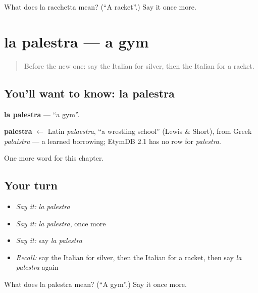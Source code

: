 \begin{tcolorbox}[breakable,colback=teal!4,colframe=teal!35!black,title={Before you move on}]
What does la racchetta mean? (\textquotedblleft{}A racket\textquotedblright{}.) Say it once more.
\end{tcolorbox}
\section[la palestra]{la palestra — a gym}

\label{lesson:IT-C202-palestra}



\begin{quote}
Before the new one: say the Italian for silver, then the Italian for a racket.
\end{quote}

\subsection*{You'll want to know: la palestra}
\textbf{la palestra} — \textquotedblleft{}a gym\textquotedblright{}.

\begin{cousinweb}
\textbf{palestra} $\leftarrow$ Latin \emph{palaestra}, \textquotedblleft{}a wrestling school\textquotedblright{} (Lewis \& Short), from Greek \emph{palaistra} — a learned borrowing; EtymDB 2.1 has no row for \emph{palestra}.
\end{cousinweb}

\begin{grammarlens}[title={What you've built}]
One more word for this chapter.
\end{grammarlens}

\subsection*{Your turn}
\begin{itemize}
\raggedright
  \item \emph{Say it:} \emph{la palestra}
  \item \emph{Say it:} \emph{la palestra}, once more
  \item \emph{Say it:} say \emph{la palestra}
  \item \emph{Recall:} say the Italian for silver, then the Italian for a racket, then say \emph{la palestra} again
\end{itemize}

\begin{tcolorbox}[breakable,colback=teal!4,colframe=teal!35!black,title={Before you move on}]
What does la palestra mean? (\textquotedblleft{}A gym\textquotedblright{}.) Say it once more.
\end{tcolorbox}
